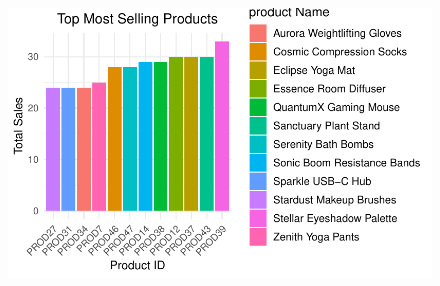 \documentclass[
  letterpaper,
  DIV=11,
  numbers=noendperiod]{scrartcl}
\begin{document}
\begin{figure}[H]

{\centering \includegraphics{Report_files/figure-pdf/unnamed-chunk-26-2.pdf}

}

\end{figure}
\end{document}
